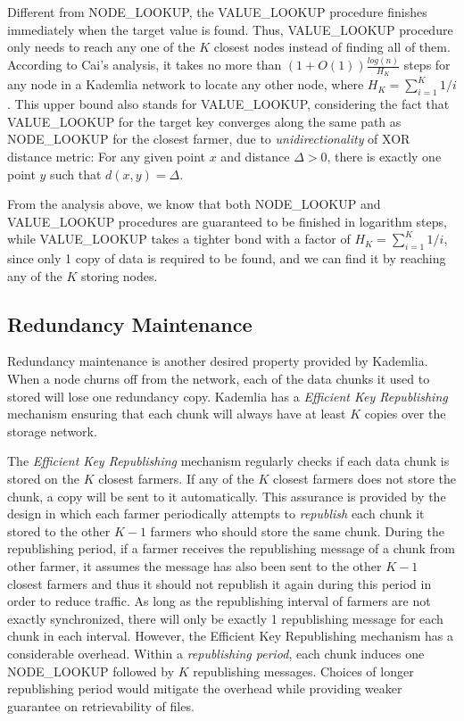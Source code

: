 Different from NODE\_LOOKUP, the VALUE\_LOOKUP procedure finishes immediately when the target value is found. Thus, VALUE\_LOOKUP procedure only needs to reach any one of the $K$ closest nodes instead of finding all of them. According to Cai's analysis\cite{cai2013probabilistic}, it takes no more than $(1+O(1))\frac{log(n)}{H_{K}}$ steps for any node in a Kademlia network to locate any other node, where $H_K = \sum_{i=1}^{K} 1/i$. This upper bound also stands for VALUE\_LOOKUP, considering the fact that VALUE\_LOOKUP for the target key converges along the same path as NODE\_LOOKUP for the closest farmer, due to \textit{unidirectionality} of XOR distance metric: For any given point $x$ and distance $\Delta>0$, there is exactly one point $y$ such that $d(x,y)=\Delta$.

From the analysis above, we know that both NODE\_LOOKUP and VALUE\_LOOKUP procedures are guaranteed to be finished in logarithm steps, while VALUE\_LOOKUP takes a tighter bond with a factor of $H_K = \sum_{i=1}^{K} 1/i$, since only 1 copy of data is required to be found, and we can find it by reaching any of the $K$ storing nodes.

\subsection{Redundancy Maintenance}
\label{ss:redundancymaintenance}
Redundancy maintenance is another desired property provided by Kademlia. When a node churns off from the network, each of the data chunks it used to stored will lose one redundancy copy. Kademlia has a \textit{Efficient Key Republishing} mechanism ensuring that each chunk will always have at least $K$ copies over the storage network.

The \textit{Efficient Key Republishing} mechanism regularly checks if each data chunk is stored on the $K$ closest farmers. If any of the $K$ closest farmers does not store the chunk, a copy will be sent to it automatically. This assurance is provided by the design in which each farmer periodically attempts to \textit{republish} each chunk it stored to the other $K-1$ farmers who should store the same chunk. During the republishing period, if a farmer receives the republishing message of a chunk from other farmer, it assumes the message has also been sent to the other $K-1$ closest farmers and thus it should not republish it again during this period in order to reduce traffic. As long as the republishing interval of farmers are not exactly synchronized, there will only be exactly 1 republishing message for each chunk in each interval. However, the Efficient Key Republishing mechanism has a considerable overhead. Within a \textit{republishing period}, each chunk induces one NODE\_LOOKUP followed by $K$ republishing messages. Choices of longer republishing period would mitigate the overhead while providing weaker guarantee on retrievability of files.

